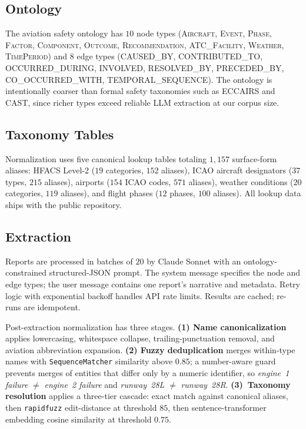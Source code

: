 \documentclass[10pt,a4paper]{article}
\begin{document}
\subsection{Ontology}

The aviation safety ontology has $10$ node types (\textsc{Aircraft},
\textsc{Event}, \textsc{Phase}, \textsc{Factor}, \textsc{Component},
\textsc{Outcome}, \textsc{Recommendation}, \textsc{ATC\_Facility},
\textsc{Weather}, \textsc{TimePeriod}) and $8$ edge types
(\textsc{CAUSED\_BY}, \textsc{CONTRIBUTED\_TO},
\textsc{OCCURRED\_DURING}, \textsc{INVOLVED}, \textsc{RESOLVED\_BY},
\textsc{PRECEDED\_BY}, \textsc{CO\_OCCURRED\_WITH},
\textsc{TEMPORAL\_SEQUENCE}). The ontology is intentionally coarser
than formal safety taxonomies such as ECCAIRS and CAST, since richer
types exceed reliable LLM extraction at our corpus size.

\subsection{Taxonomy Tables}

Normalization uses five canonical lookup tables totaling $1{,}157$
surface-form aliases: HFACS Level-2 ($19$ categories, $152$ aliases),
ICAO aircraft designators ($37$ types, $215$ aliases), airports
($154$ ICAO codes, $571$ aliases), weather conditions ($20$
categories, $119$ aliases), and flight phases ($12$ phases, $100$
aliases). All lookup data ships with the public repository.

\subsection{Extraction}

Reports are processed in batches of $20$ by Claude Sonnet with an
ontology-constrained structured-JSON prompt. The system message
specifies the node and edge types; the user message contains one
report's narrative and metadata. Retry logic with exponential backoff
handles API rate limits. Results are cached; re-runs are idempotent.

Post-extraction normalization has three stages.
\textbf{(1) Name canonicalization} applies lowercasing, whitespace
collapse, trailing-punctuation removal, and aviation abbreviation
expansion. \textbf{(2) Fuzzy deduplication} merges within-type names
with \texttt{SequenceMatcher} similarity above $0.85$; a number-aware
guard prevents merges of entities that differ only by a numeric
identifier, so \emph{engine~1 failure} $\neq$ \emph{engine~2
failure} and \emph{runway~28L} $\neq$ \emph{runway~28R}.
\textbf{(3)~Taxonomy resolution} applies a three-tier cascade: exact
match against canonical aliases, then \texttt{rapidfuzz} edit-distance
at threshold $85$, then sentence-transformer embedding cosine
similarity at threshold $0.75$.
\end{document}
